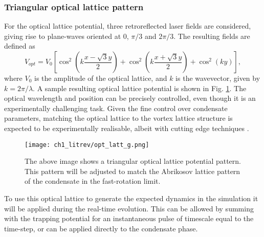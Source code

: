 \subsubsection{Triangular optical lattice pattern}
For the optical lattice potential, three retroreflected laser fields are considered, giving rise to plane-waves oriented at 0, $\pi/3$ and $2\pi/3$. The resulting fields are defined as
\begin{equation}\label{eqn:lattice_potential_tri}
V_{opt} = V_0\left[\cos^2\left(k\frac{x-\sqrt{3}y}{2} \right) + \cos^2\left(k\frac{x+\sqrt{3}y}{2} \right) +\cos^2\left(ky\right)\right],
\end{equation}
where $V_0$ is the amplitude of the optical lattice, and $k$ is the wavevector, given by $k=2\pi/\lambda$. A sample resulting optical lattice potential is shown in Fig. \ref{fig:optical_lattice}. The optical wavelength and position can be precisely controlled, even though it is an experimentally challenging task. Given the fine control over condensate parameters, matching the optical lattice to the vortex lattice structure is expected to be experimentally realisable, albeit with cutting edge techniques \cite{Vtx:Tung_prl_2006}.
\begin{figure}
\centering
	\texttt{[image: ch1\_litrev/opt\_latt\_g.png]}
	\caption{The above image shows a triangular optical lattice potential pattern. This pattern will be adjusted to match the Abrikosov lattice pattern of the condensate in the fast-rotation limit.}\label{fig:optical_lattice}
\end{figure}
To use this optical lattice to generate the expected dynamics in the simulation it will be applied during the real-time evolution. This can be allowed by summing with the trapping potential for an instantaneous pulse of timescale equal to the time-step, or can be applied directly to the condensate phase.

